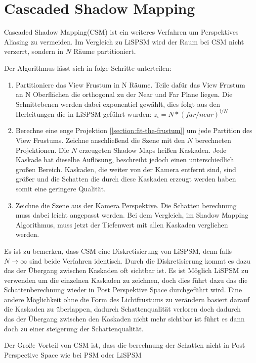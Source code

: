 \section{Cascaded Shadow Mapping}
\label{section:csm}
Cascaded Shadow Mapping(CSM) \cite{Engel2007}\cite{Zhang2006} ist ein weiteres Verfahren um Perspektives Aliasing zu vermeiden.
Im Vergleich zu LiSPSM wird der Raum bei CSM nicht verzerrt, sondern in $N$ Räume partitioniert.
\par
Der Algorithmus lässt sich in folge Schritte unterteilen:
\begin{enumerate}
  \item Partitioniere das View Frustum in N Räume. 
    Teile dafür das View Frustum an N Oberflächen die orthogonal zu der Near und Far Plane liegen.
    Die Schnittebenen werden dabei exponentiel gewählt, dies folgt aus den Herleitungen die in LiSPSM geführt wurden: 
    $z_{i} = N * (far / near)^{i/N}$
  \item Berechne eine enge Projektion [\ref{section:fit-the-frustum}] um jede Partition des View Frustums.
    Zeichne anschließend die Szene mit den $N$ berechneten Projektionen.
    Die $N$ erzeugeten Shadow Maps heißen Kaskaden.
    Jede Kaskade hat dieselbe Auflösung, beschreibt jedoch einen unterschiedlich großen Bereich.
    Kaskaden, die weiter von der Kamera entfernt sind, sind größer und die Schatten die durch diese Kaskaden erzeugt werden haben somit eine 
    geringere Qualität.

  \item Zeichne die Szene aus der Kamera Perspektive. 
    Die Schatten berechnung muss dabei leicht angepasst werden.
    Bei dem Vergleich, im Shadow Mapping Algorithmus, muss jetzt der Tiefenwert mit allen Kaskaden verglichen werden.
\end{enumerate}
Es ist zu bemerken, dass CSM eine Diskretisierung von LiSPSM, denn falls $N\rightarrow\infty$ sind beide Verfahren identisch. 
Durch die Diskretisierung kommt es dazu das der Übergang zwischen Kaskaden oft sichtbar ist.
Es ist Möglich LiSPSM zu verwenden um die einzelnen Kaskaden zu zeichnen, doch dies führt dazu das die Schattenberechnung wieder
in Post Perspektive Space durchgeführt wird. 
Eine andere Möglichkeit ohne die Form des Lichtfrustums zu verändern basiert darauf die Kaskaden zu überlappen,
dadurch Schattenqualität verloren doch dadurch das der Übergang zwischen den Kaskaden nicht mehr sichtbar ist 
führt es dann doch zu einer steigerung der Schattenqualität.
\par
Der Große Vorteil von CSM ist, dass die berechnung der Schatten nicht in Post Perspective Space wie bei PSM oder LiSPSM 
